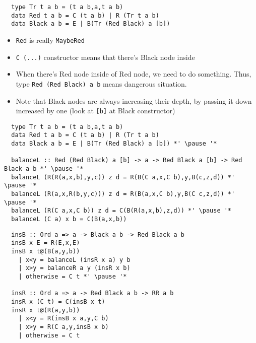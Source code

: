 \documentclass[aspectratio=43]{beamer}
\begin{document}
\begin{frame}[fragile]
 \begin{lstlisting}
  type Tr t a b = (t a b,a,t a b)
  data Red t a b = C (t a b) | R (Tr t a b)
  data Black a b = E | B(Tr (Red Black) a [b])
 \end{lstlisting}
 \pause
 \begin{itemize}
  \item \texttt{Red} is really \texttt{MaybeRed}
  \pause
  \item \texttt{C (...)} constructor means that there's Black node inside
  \pause
  \item When there's Red node inside of Red node, we need to do something. Thus, type \texttt{Red (Red Black) a b} means dangerous situation.
  \pause
  \item Note that Black nodes are always increasing their depth, by passing it down increased by one (look at \texttt{[b]} at Black constructor)
 \end{itemize}
\end{frame}

\begin{frame}[fragile]
 \begin{lstlisting}
  type Tr t a b = (t a b,a,t a b)
  data Red t a b = C (t a b) | R (Tr t a b)
  data Black a b = E | B(Tr (Red Black) a [b]) *' \pause '*
  
  balanceL :: Red (Red Black) a [b] -> a -> Red Black a [b] -> Red Black a b *' \pause '*
  balanceL (R(R(a,x,b),y,c)) z d = R(B(C a,x,C b),y,B(c,z,d)) *' \pause '*
  balanceL (R(a,x,R(b,y,c))) z d = R(B(a,x,C b),y,B(C c,z,d)) *' \pause '*
  balanceL (R(C a,x,C b)) z d = C(B(R(a,x,b),z,d)) *' \pause '*
  balanceL (C a) x b = C(B(a,x,b))
 \end{lstlisting}
\end{frame}

\begin{frame}[fragile]
 \begin{lstlisting}
  insB :: Ord a => a -> Black a b -> Red Black a b
  insB x E = R(E,x,E)
  insB x t@(B(a,y,b))
    | x<y = balanceL (insR x a) y b
    | x>y = balanceR a y (insR x b)
    | otherwise = C t *' \pause '*

  insR :: Ord a => a -> Red Black a b -> RR a b
  insR x (C t) = C(insB x t)
  insR x t@(R(a,y,b))
    | x<y = R(insB x a,y,C b)
    | x>y = R(C a,y,insB x b)
    | otherwise = C t 
 \end{lstlisting}
\end{frame}
\end{document}
